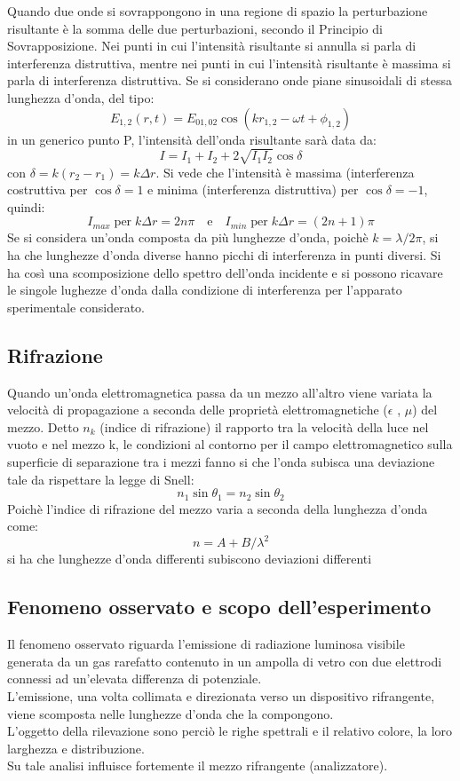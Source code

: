 Quando due onde si sovrappongono in una regione di spazio la perturbazione risultante è la somma delle due perturbazioni, secondo il Principio di Sovrapposizione. Nei punti in cui l'intensità risultante si annulla si parla di interferenza distruttiva, mentre nei punti in cui l'intensità risultante è massima si parla di interferenza distruttiva. 
Se si considerano onde piane sinusoidali di stessa lunghezza d'onda, del tipo:
    $$E_{1,2}(r,t) = E_{01,02}\cos(kr_{1,2}-\omega t +\phi_{1,2})$$
in un generico punto P, l'intensità dell'onda risultante sarà data da:
    $$ I = I_1 + I_2 + 2\sqrt{I_1I_2}\cos\delta $$
con $\delta = k(r_2-r_1) = k\Delta r$. Si vede che l'intensità è massima (interferenza costruttiva per $\cos\delta = 1$ e minima (interferenza distruttiva) per $\cos\delta = -1$, quindi:
    $$I_{max} \; \mathrm{per} \; k\Delta r = 2n\pi
    \quad\mathrm{e}\quad I_{min} \;\mathrm{per}\; k\Delta r = (2n+1)\pi $$
Se si considera un'onda composta da più lunghezze d'onda, poichè $ k = \lambda/2\pi $, si ha che lunghezze d'onda diverse hanno picchi di interferenza in punti diversi. Si ha così una scomposizione dello spettro dell'onda incidente e si possono ricavare le singole lughezze d'onda dalla condizione di interferenza per l'apparato sperimentale considerato.

\subsection{Rifrazione}
Quando un'onda elettromagnetica passa da un mezzo all'altro viene variata la velocità di propagazione a seconda delle proprietà elettromagnetiche ($\epsilon$ , $\mu$) del mezzo. Detto $n_k$ (indice di rifrazione) il rapporto tra la velocità della luce nel vuoto e nel mezzo k, le condizioni al contorno per il campo elettromagnetico sulla superficie di separazione tra i mezzi fanno si che l'onda subisca una deviazione tale da rispettare la legge di Snell:
    $$n_1\sin\theta_1 = n_2\sin\theta_2$$
Poichè l'indice di rifrazione del mezzo varia a seconda della lunghezza d'onda come:
    $$ n = A +  B/\lambda^2 $$
si ha che lunghezze d'onda differenti subiscono deviazioni differenti

\subsection{Fenomeno osservato e scopo dell'esperimento }
%
Il fenomeno osservato riguarda l'emissione di radiazione luminosa visibile generata da un gas rarefatto contenuto in un ampolla di vetro con due elettrodi connessi ad un'elevata differenza di potenziale.\\
%
L'emissione, una volta collimata e direzionata verso un dispositivo rifrangente, viene scomposta nelle lunghezze d'onda che la compongono.\\
%
L'oggetto della rilevazione sono perciò le righe spettrali e il relativo colore, la loro larghezza e distribuzione.\\
%
Su tale analisi influisce fortemente il mezzo rifrangente (analizzatore).\\
%
%
